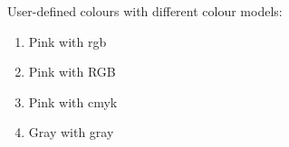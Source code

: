 \documentclass{article}
\begin{document}
User-defined colours with different colour models:

\begin{enumerate}
\item \textcolor{mypink1}{Pink with rgb}
\item \textcolor{mypink2}{Pink with RGB}
\item \textcolor{mypink3}{Pink with cmyk}
\item \textcolor{mygray}{Gray with gray}
\end{enumerate}
\end{document}
